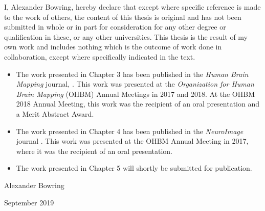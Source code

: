 \documentclass[11pt,a4paper]{report}
\begin{document}
\begin{thesisdeclaration}        
I, Alexander Bowring, hereby declare that except where specific reference is made to the work of others, the content of this thesis is original and has not been submitted in whole or in part for consideration for any other degree or qualification in these, or any other universities. This thesis is the result of my own work and includes nothing which is the outcome of work done in collaboration, except where specifically indicated in the text.

\begin{itemize}
\item The work presented in Chapter 3 has been published in the \textit{Human Brain Mapping} journal, \textit{\citet*{Bowring2019-fc}}. This work was presented at the \textit{Organization for Human Brain Mapping} (OHBM) Annual Meetings in 2017 and 2018. At the OHBM 2018 Annual Meeting, this work was the recipient of an oral presentation and a Merit Abstract Award. 
 
\item The work presented in Chapter 4 has been published in the \textit{NeuroImage} journal \textit{\citet*{BOWRING2019116187}}. This work was presented at the OHBM Annual Meeting in 2017, where it was the recipient of an oral presentation. 

\item The work presented in Chapter 5 will shortly be submitted for publication.
\end{itemize}

\vspace{2cm}
\hspace{-1.2cm}
Alexander Bowring 

\hspace{-1.2cm}
September 2019

\tableofcontents                     %






\end{thesisdeclaration}
\end{document}
